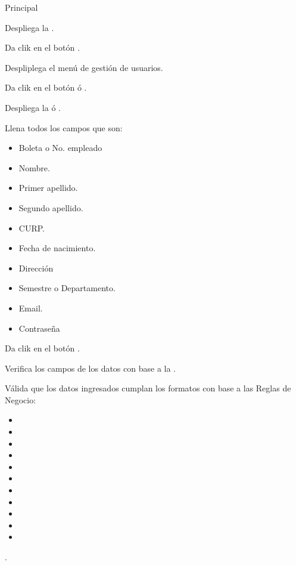 	
	
	\begin{UCtrayectoria}{Principal}
	
		\UCpaso Despliega la .

		\UCpaso[\UCactor] Da clik en el botón .

		\UCpaso Despliplega el menú de gestión de usuarios. 

		\UCpaso[\UCactor] Da clik en el botón  ó .

		\UCpaso Despliega la  ó .

		\UCpaso[\UCactor] Llena todos los campos que son: 
			\begin{itemize}
				\item Boleta o No. empleado
				\item Nombre.
				\item Primer apellido.
				\item Segundo apellido.
				\item CURP.
				\item Fecha de nacimiento.
				\item Dirección
				\item Semestre o Departamento.
				\item Email.
				\item Contraseña
			\end{itemize} 
		\label{CU4.1FormularioLector}

		\UCpaso[\UCactor] Da clik en el botón .\label{CU4.2ConectarBaseDatos}

		\UCpaso Verifica los campos de los datos con base a la  .

		\UCpaso Válida que los datos ingresados cumplan los formatos con base a las Reglas de Negocio: 
				
			\begin{itemize}
				\item	{} 
				\item	{} 
				\item	{} 
				\item	{} 
				\item	{} 
				\item	{} 
				\item	{} 
				\item	{}
				\item	{}
				\item	{}
				\item	{}
			\end{itemize} 
		.
		

\end{UCtrayectoria}
